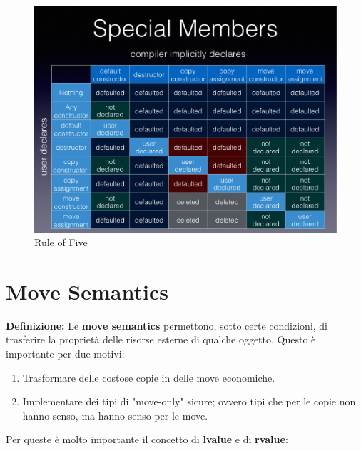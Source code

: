 \begin{figure}[ht]
	\centering
	\includegraphics[width=1\textwidth, height=1\textheight, keepaspectratio]{./imgs/rule_of_five.png}
	\caption{Rule of Five}
	\label{fig:rule_of_five}
\end{figure}



\section{Move Semantics}

\textsf{\small \textbf{Definizione: } Le \textbf{move semantics} permettono, sotto certe condizioni, di trasferire la proprietà delle risorse esterne di qualche oggetto. Questo è importante per due motivi: } \\

\begin{enumerate}
	\item \textsf{\small Trasformare delle costose copie in delle move economiche.}
	\item \textsf{\small Implementare dei tipi di "move-only" sicure; ovvero tipi che per le copie non hanno senso, ma hanno senso per le move.}
\end{enumerate}

\textsf{\small Per queste è molto importante il concetto di \textbf{lvalue} e di \textbf{rvalue}: } \\

